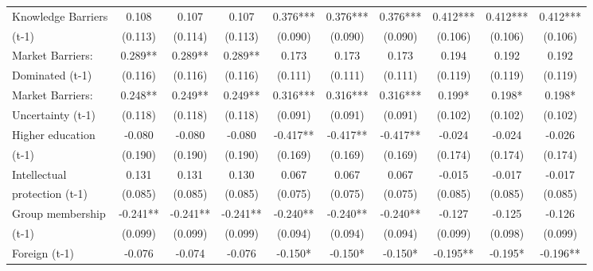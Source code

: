\begin{table}[htbp]
\begin{tabular}{l*{9}{c}}
Knowledge Barriers  &       0.108   &       0.107   &       0.107   &       0.376***&       0.376***&       0.376***&       0.412***&       0.412***&       0.412***\\
(t-1)               &     (0.113)   &     (0.114)   &     (0.113)   &     (0.090)   &     (0.090)   &     (0.090)   &     (0.106)   &     (0.106)   &     (0.106)   \\
Market Barriers:    &       0.289** &       0.289** &       0.289** &       0.173   &       0.173   &       0.173   &       0.194   &       0.192   &       0.192   \\
Dominated (t-1)     &     (0.116)   &     (0.116)   &     (0.116)   &     (0.111)   &     (0.111)   &     (0.111)   &     (0.119)   &     (0.119)   &     (0.119)   \\
Market Barriers:    &       0.248** &       0.249** &       0.249** &       0.316***&       0.316***&       0.316***&       0.199*  &       0.198*  &       0.198*  \\
Uncertainty (t-1)   &     (0.118)   &     (0.118)   &     (0.118)   &     (0.091)   &     (0.091)   &     (0.091)   &     (0.102)   &     (0.102)   &     (0.102)   \\
Higher education    &      -0.080   &      -0.080   &      -0.080   &      -0.417** &      -0.417** &      -0.417** &      -0.024   &      -0.024   &      -0.026   \\
(t-1)               &     (0.190)   &     (0.190)   &     (0.190)   &     (0.169)   &     (0.169)   &     (0.169)   &     (0.174)   &     (0.174)   &     (0.174)   \\
Intellectual        &       0.131   &       0.131   &       0.130   &       0.067   &       0.067   &       0.067   &      -0.015   &      -0.017   &      -0.017   \\
protection (t-1)    &     (0.085)   &     (0.085)   &     (0.085)   &     (0.075)   &     (0.075)   &     (0.075)   &     (0.085)   &     (0.085)   &     (0.085)   \\
Group membership    &      -0.241** &      -0.241** &      -0.241** &      -0.240** &      -0.240** &      -0.240** &      -0.127   &      -0.125   &      -0.126   \\
(t-1)               &     (0.099)   &     (0.099)   &     (0.099)   &     (0.094)   &     (0.094)   &     (0.094)   &     (0.099)   &     (0.098)   &     (0.099)   \\
Foreign (t-1)       &      -0.076   &      -0.074   &      -0.076   &      -0.150*  &      -0.150*  &      -0.150*  &      -0.195** &      -0.195*  &      -0.196** \\

\end{tabular}
\end{table}
